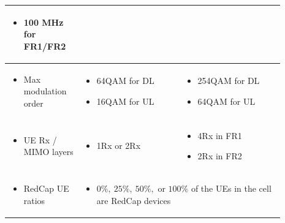 \documentclass[conference]{IEEEtran}
\begin{document}
\begin{table}
\begin{tabular}{|p{0.23\linewidth}| p{0.33\linewidth} |  p{0.33\linewidth}|}
    \begin{itemize}[leftmargin=*]
        \item 100 MHz for FR1/FR2
        
    \end{itemize}   \\
\hline
    \begin{itemize}[leftmargin=0,label={}]
        \item Max modulation order
    \end{itemize}  & 
    \begin{itemize}[leftmargin=*]
        \item 64QAM for DL
        \item 16QAM for UL
    \end{itemize}   &
    
    \begin{itemize}[leftmargin=*]
        \item 254QAM for DL
        \item 64QAM for UL
    \end{itemize}   \\
\hline

    \begin{itemize}[leftmargin=0,label={}]
        \item UE Rx / MIMO layers
    \end{itemize}  & 
    \begin{itemize}[leftmargin=*]
        \item 1Rx or 2Rx
    \end{itemize}   &
    
    \begin{itemize}[leftmargin=*]
        \item 4Rx in FR1
        \item 2Rx in FR2
    \end{itemize}   \\
\hline
    \begin{itemize}[leftmargin=0,label={}]
        \item  RedCap UE ratios
    \end{itemize}  &  
    \multicolumn{2}{|p{0.66\linewidth}|}{
    \begin{itemize}[leftmargin=*]
        \item $0\%,\: 25 \%,\: 50 \%,$ or $100 \%$ of the UEs in the cell are RedCap devices
    \end{itemize} 
    }  \\
\hline

\end{tabular}
\label{table:sls-assumption}
\end{table}
\end{document}
